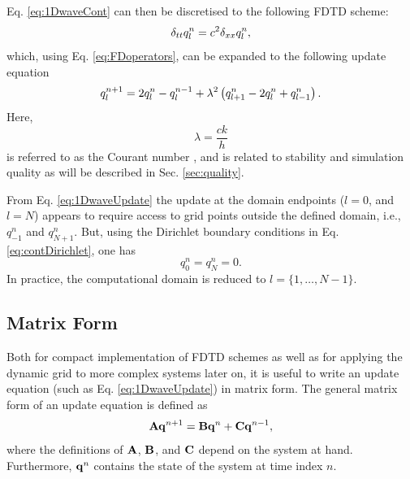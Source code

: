 \documentclass[fleqn]{jaes}
\def\SBcomment[#1]{\textcolor{red}{#1}}
\def\SWcomment[#1]{\textcolor{blue}{#1}}
\begin{document}
Eq. \eqref{eq:1DwaveCont} can then be discretised to the following FDTD scheme:
\begin{equation}\label{eq:1dWaveDisc}
    \dtt \qln = c^2 \dxx \qln,
\end{equation}
which, using Eq. \eqref{eq:FDoperators}, can be expanded to the following update equation
\begin{equation}\label{eq:1DwaveUpdate}
    q_l^{n+1} = 2 \qln - q_l^{n-1} + \lambda^2 \left(q_{l+1}^n -2\qln + q_{l-1}^n\right).
\end{equation}
Here, 
\begin{equation}\label{eq:courant}
    \lambda = \frac{c k}{h}
\end{equation} is referred to as the Courant number \cite{Courant1928}, and is related to stability and simulation quality as will be described in Sec. \ref{sec:quality}.

From Eq. \eqref{eq:1DwaveUpdate} the update at the domain endpoints ($l=0$, and $l=N$) appears to require access to grid points outside the defined domain, i.e., $q_{-1}^n$ and $q_{N+1}^n$. But, using the Dirichlet boundary conditions in Eq. \eqref{eq:contDirichlet}, one has 
\begin{equation}\label{eq:discDirichlet}
    q_0^n = q_N^n = 0.
\end{equation}
In practice, the computational domain is reduced to $l=\{1, \hdots, N-1\}$. 

\subsection{Matrix Form}\label{sec:matrixFormOrig}
Both for compact implementation of FDTD schemes as well as for applying the dynamic grid to more complex systems later on, it is useful to write an update equation (such as Eq. \eqref{eq:1DwaveUpdate}) in matrix form. The general matrix form of an update equation is defined as
\begin{equation}\label{eq:generalMatrixUpdate}
    \A \q^{n+1} = \B \q^n + \C \q^{n-1},
\end{equation}
where the definitions of $\mathbf{A}$, $\mathbf{B}$, and $\mathbf{C}$ depend on the system at hand. Furthermore, $\mathbf{q}^n$ contains the state of the system at time index $n$. 
\end{document}
